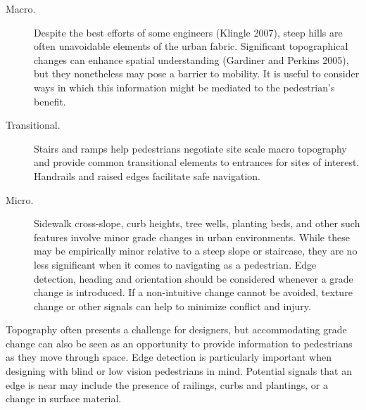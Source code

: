 \begin{description}
    \item[Macro.]
Despite the best efforts of some engineers (Klingle 2007), steep hills are often unavoidable elements of the urban fabric.  Significant topographical changes can enhance spatial understanding (Gardiner and Perkins 2005), but they nonetheless may pose a barrier to mobility. It is useful to consider ways in which this information might be mediated to the pedestrian's benefit.      
    \item[Transitional.]
Stairs and ramps help pedestrians negotiate site scale macro topography 
and provide common transitional elements to entrances for sites of interest.  Handrails and raised edges facilitate safe navigation.

    \item[Micro.]
Sidewalk cross-slope, curb heights, tree wells, planting beds, and other such features involve minor grade changes in urban environments.  While these may be empirically minor relative to a steep slope or staircase, they are no less significant when it comes to navigating as a pedestrian.  Edge detection, heading and orientation should be considered whenever a grade change is introduced.  If a non-intuitive change cannot be avoided, texture change or other signals can help to minimize conflict and injury.   

\end{description}


Topography often presents a challenge for designers, but accommodating grade change can also be seen as an opportunity to provide information to pedestrians as they move through space.  Edge detection is particularly important when designing with blind or low vision pedestrians in mind.  Potential signals that an edge is near may include the presence of railings, curbs and plantings, or a change in surface material. 

